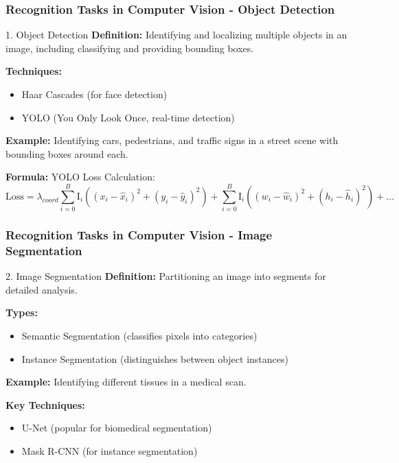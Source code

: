 \documentclass[aspectratio=169]{beamer}
\begin{document}
\begin{frame}[fragile]
    \frametitle{Recognition Tasks in Computer Vision - Object Detection}
    \begin{block}{1. Object Detection}
        \textbf{Definition:} Identifying and localizing multiple objects in an image, including classifying and providing bounding boxes.
        
        \textbf{Techniques:}
        \begin{itemize}
            \item Haar Cascades (for face detection)
            \item YOLO (You Only Look Once, real-time detection)
        \end{itemize}
        
        \textbf{Example:} Identifying cars, pedestrians, and traffic signs in a street scene with bounding boxes around each.
        
        \textbf{Formula:} YOLO Loss Calculation:
        \begin{equation}
            \text{Loss} = \lambda_{coord} \sum_{i=0}^{B} \text{I}_{i} \left( (x_i - \hat{x}_i)^2 + (y_i - \hat{y}_i)^2 \right) + \sum_{i=0}^{B} \text{I}_{i} \left( (w_i - \hat{w}_i)^2 + (h_i - \hat{h}_i)^2 \right) + ...
        \end{equation}
    \end{block}
\end{frame}

\begin{frame}[fragile]
    \frametitle{Recognition Tasks in Computer Vision - Image Segmentation}
    \begin{block}{2. Image Segmentation}
        \textbf{Definition:} Partitioning an image into segments for detailed analysis.
        
        \textbf{Types:}
        \begin{itemize}
            \item Semantic Segmentation (classifies pixels into categories)
            \item Instance Segmentation (distinguishes between object instances)
        \end{itemize}
        
        \textbf{Example:} Identifying different tissues in a medical scan.
        
        \textbf{Key Techniques:}
        \begin{itemize}
            \item U-Net (popular for biomedical segmentation)
            \item Mask R-CNN (for instance segmentation)
        \end{itemize}
    \end{block}
\end{frame}
\end{document}
